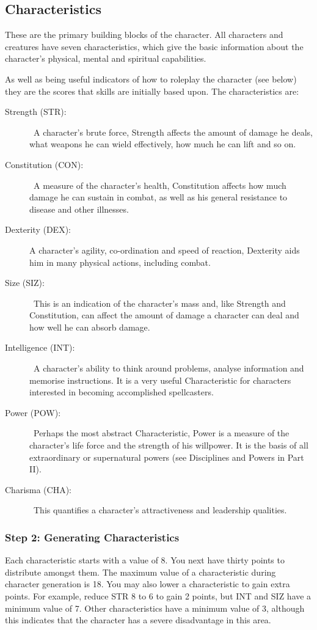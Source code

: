 \subsection{Characteristics}
These are the primary building blocks of the character. All characters and creatures have seven characteristics, which give the basic information about the character’s physical, mental and spiritual capabilities.

As well as being useful indicators of how to roleplay the character (see below) they are the scores that skills are initially based upon. The characteristics are:

\begin{description}
	\item[Strength (STR):] A character’s brute force, Strength affects the amount of damage he deals, what weapons he can wield effectively, how much he can lift and so on. 
	\item[Constitution (CON):] A measure of the character’s health, Constitution affects how much damage he can sustain in combat, as well as his general resistance to disease and other illnesses.
	\item[Dexterity (DEX):] A character’s agility, co-ordination and speed of reaction, Dexterity aids him in many physical actions, including combat. 
	\item[Size (SIZ):] This is an indication of the character’s mass and, like Strength and Constitution, can affect the amount of damage a character can deal and how well he can absorb damage.
	\item[Intelligence (INT):] A character’s ability to think around problems, analyse information and memorise instructions. It is a very useful Characteristic for characters interested in becoming accomplished spellcasters. 
	\item[Power (POW):] Perhaps the most abstract Characteristic, Power is a measure of the character’s life force and the strength of his willpower. It is the basis of all extraordinary or supernatural powers (see Disciplines and Powers in Part II).
	\item[Charisma (CHA):] This quantifies a character’s attractiveness and leadership qualities. 
\end{description}


\subsubsection{Step 2: Generating Characteristics}
Each characteristic starts with a value of 8.  You next have thirty points to distribute amongst them. The maximum value of a characteristic during character generation is 18. You may also lower a characteristic to gain extra points. For example, reduce STR 8 to 6 to gain 2 points, but INT and SIZ have a minimum value of 7. Other characteristics have a minimum value of 3, although this indicates that the character has a severe disadvantage in this area. 

